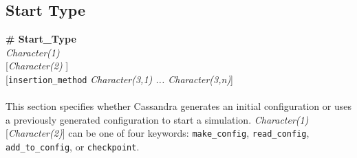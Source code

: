 \subsection{Start Type}\label{sec:Start_Type}
{\bf \# Start\_Type} \\
{\it Character(1) } \\
{[}{\it Character(2) }] \\
{[}{\tt insertion\_method} {\it Character(3,1) ... Character(3,n)}] \\ \\
%
This section specifies whether Cassandra generates an initial configuration or 
uses a previously generated configuration to start a simulation. 
{\it Character(1)} [{\it Character(2)}] can be one of four keywords:
{\tt make\_config}, {\tt read\_config}, {\tt add\_to\_config}, or {\tt checkpoint}.


